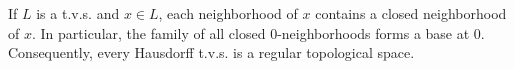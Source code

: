 If $L$ is a t.v.s. and $x \in L$, each neighborhood of $x$ contains a closed neighborhood of $x$. In particular, the family of all closed 0-neighborhoods forms a base at 0. Consequently, every Hausdorff t.v.s. is a regular topological space.
